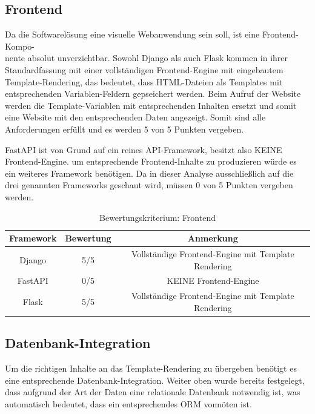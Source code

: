 \documentclass[letterpaper,11pt,leqno]{article}
\begin{document}
\subsection{Frontend}
Da die Softwarelösung eine visuelle Webanwendung sein soll, ist eine Frontend-Kompo-\\nente absolut unverzichtbar. Sowohl Django als
auch Flask kommen in ihrer Standardfassung mit einer vollständigen Frontend-Engine mit eingebautem Template-Rendering, das bedeutet,
dass HTML-Dateien als Templates mit entsprechenden Variablen-Feldern gepseichert werden. Beim Aufruf der Website werden die
Template-Variablen mit entsprechenden Inhalten ersetzt und somit eine Website mit den entsprechenden Daten angezeigt. Somit sind
alle Anforderungen erfüllt und es werden 5 von 5 Punkten vergeben.

FastAPI ist von Grund auf ein reines API-Framework, besitzt also KEINE Frontend-Engine. um entsprechende Frontend-Inhalte zu
produzieren würde es ein weiteres Framework benötigen. Da in dieser Analyse ausschließlich auf die drei genannten Frameworks
geschaut wird, müssen 0 von 5 Punkten vergeben werden.

\begin{table}[h!]
	\begin{center}
		\begin{tabular}{|c||c|c|}
			\hline
			Framework & Bewertung & Anmerkung\\
			\hline\hline
			Django & 5/5 & Vollständige Frontend-Engine mit Template Rendering\\
			FastAPI & 0/5 & KEINE Frontend-Engine\\
			Flask & 5/5 & Vollständige Frontend-Engine mit Template Rendering\\
			\hline
		\end{tabular}
		\caption{Bewertungskriterium: Frontend}
	\end{center}
	\label{table:2}
\end{table}

\subsection{Datenbank-Integration}
Um die richtigen Inhalte an das Template-Rendering zu übergeben benötigt es eine entsprechende Datenbank-Integration. Weiter oben
wurde bereits festgelegt, dass aufgrund der Art der Daten eine relationale Datenbank notwendig ist, was automatisch bedeutet, dass
ein entsprechendes ORM vonnöten ist.
\end{document}
